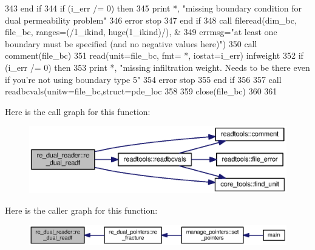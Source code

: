 \begin{DoxyCode}
343 \textcolor{keywordflow}{      end if} 
344       \textcolor{keywordflow}{if} (i\_err /= 0) \textcolor{keywordflow}{then}
345         print *, \textcolor{stringliteral}{"missing boundary condition for dual permeability problem"}
346         error stop
347 \textcolor{keywordflow}{      end if}  
348       \textcolor{keyword}{call }fileread(dim\_bc, file\_bc, ranges=(/1\_ikind, huge(1\_ikind)/), \textcolor{comment}{&}
349 \textcolor{comment}{          errmsg=}\textcolor{stringliteral}{"at least one boundary must be specified (and no negative values here)"}\textcolor{comment}{)}
350 \textcolor{comment}{          }\textcolor{keyword}{call }comment(file\_bc)
351       \textcolor{keyword}{read}(unit=file\_bc, fmt= *, iostat=i\_err) infweight
352       \textcolor{keywordflow}{if} (i\_err /= 0) \textcolor{keywordflow}{then}
353         print *, \textcolor{stringliteral}{"missing infiltration weight. Needs to be there even if you're not using boundary type 5"}
354         error stop
355 \textcolor{keywordflow}{      end if} 
356       
357       \textcolor{keyword}{call }readbcvals(unitw=file\_bc,struct=pde\_loc%
358 \textcolor{comment}{}
359 \textcolor{comment}{      }\textcolor{keyword}{close}(file\_bc)
360       
361       
\end{DoxyCode}


Here is the call graph for this function\+:\nopagebreak
\begin{figure}[H]
\begin{center}
\leavevmode
\includegraphics[width=350pt]{namespacere__dual__reader_a23cf85f4d1be812361380db52c0e7e33_cgraph}
\end{center}
\end{figure}




Here is the caller graph for this function\+:\nopagebreak
\begin{figure}[H]
\begin{center}
\leavevmode
\includegraphics[width=350pt]{namespacere__dual__reader_a23cf85f4d1be812361380db52c0e7e33_icgraph}
\end{center}
\end{figure}


